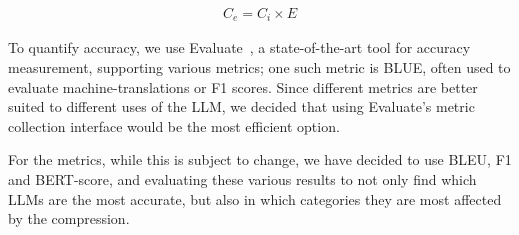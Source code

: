 \vspace*{-0.7cm}
\begin{align}
    C_{e} = C_{i} \times E
    \label{eq:CO2-emissions}
\end{align}
\vspace*{-0.6cm}

To quantify accuracy, we use Evaluate~\cite{DBLP:conf/emnlp/WerraTTLTPMRMN22}, a state-of-the-art tool for accuracy measurement, supporting various metrics; one such metric is BLUE, often used to evaluate machine-translations or F1 scores. Since different metrics are better suited to different uses of the LLM, we decided that using Evaluate’s metric collection interface would be the most efficient option. 
	
For the metrics, while this is subject to change, we have decided to use BLEU, F1 and BERT-score, and evaluating these various results to not only find which LLMs are the most accurate, but also in which categories they are most affected by the compression.
